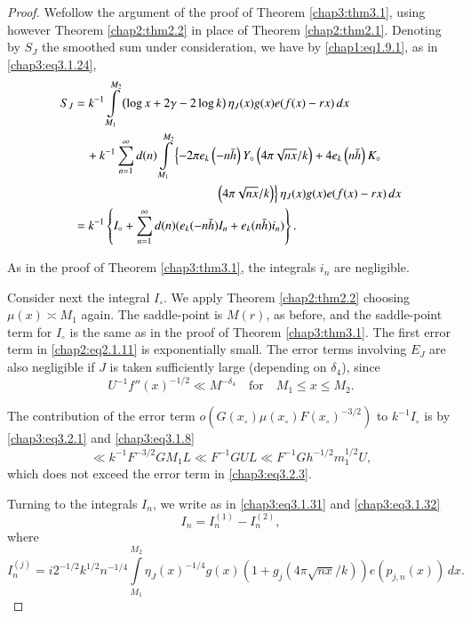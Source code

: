 \begin{proof}
We\pageoriginale follow the argument of the proof of Theorem
\ref{chap3:thm3.1}, using however Theorem \ref{chap2:thm2.2} in place
of Theorem 
\ref{chap2:thm2.1}. Denoting by $S_J$ the smoothed sum under
consideration, we have by \eqref{chap1:eq1.9.1}, as in
\eqref{chap3:eq3.1.24}, 
\begin{align}
  S_J & = k^{-1}\int\limits_{M_1}^{M_2}\left(\log x+2\gamma-2\log
  k\right)\eta_J(x)g(x)e(f(x)-rx)\,dx\label{chap3:eq3.2.7}\\
  &\quad +k^{-1}\sum\limits_{n=1}^\infty d(n)\int\limits_{M_1}^{M_2}
  \left\{-2\pi e_k\left(-n\bar{h}\right)Y_\circ\left(4\pi\sqrt{nx}/k
  \right)+4e_k\left(n\bar{h}\right)K_\circ\right.\notag\\
  & \hspace{4cm}\left.\left(4\pi\sqrt{nx}/k\right) \right\}
  \eta_J(x)g(x)e(f(x)-rx)\,dx\notag\\ 
  &= k^{-1}\left\{I_\circ+\sum\limits_{n=1}^\infty d(n)(e_k(-n\bar{h})
  I_n+e_k(n\bar{h})i_n)\right\}.\notag
\end{align}

As in the proof of Theorem \ref{chap3:thm3.1}, the integrals $i_n$ are
negligible.

Consider next the integral $I_\circ$. We apply Theorem
\ref{chap2:thm2.2} choosing\break $\mu(x)\asymp M_1$ again. The saddle-point
is $M(r)$, as before, and the saddle-point term for $I_\circ$ is the
same as in the proof of Theorem \ref{chap3:thm3.1}. The first error
term in \eqref{chap2:eq2.1.11} is exponentially small. The error terms
involving $E_J$ are also negligible if $J$ is taken sufficiently large
(depending on $\delta_4$), since
$$
U^{-1}f''(x)^{-1/2}\ll M^{-\delta_4}\quad\text{for}\quad M_1\leq x\leq
M_2. 
$$

The contribution of the error term $o(G(x_\circ)\mu(x_\circ)F
(x_\circ)^{-3/2})$ to $k^{-1}I_\circ$ is by \eqref{chap3:eq3.2.1} and
\eqref{chap3:eq3.1.8} 
$$
\ll k^{-1}F^{-3/2}GM_1L\ll F^{-1}GUL\ll F^{-1}Gh^{-1/2}m_1^{1/2}U,
$$
which does not exceed the error term in \eqref{chap3:eq3.2.3}. 

Turning to the integrals $I_n$, we write as in \eqref{chap3:eq3.1.31}
and \eqref{chap3:eq3.1.32}
$$
I_n = I_n^{(1)}-I_n^{(2)},
$$
where\pageoriginale
{\fontsize{10}{12}\selectfont
\begin{equation}\label{chap3:eq3.2.8}
I_n^{(j)}=i2^{-1/2}k^{1/2}n^{-1/4}\int\limits_{M_1}^{M_2}\eta_J(x)^{-1/4}
g(x)\left(1+g_j\left(4\pi\sqrt{nx}/k\right)\right)e\left(p_{j,n}(x)
\right)\,dx. 
\end{equation}}


\end{proof}
